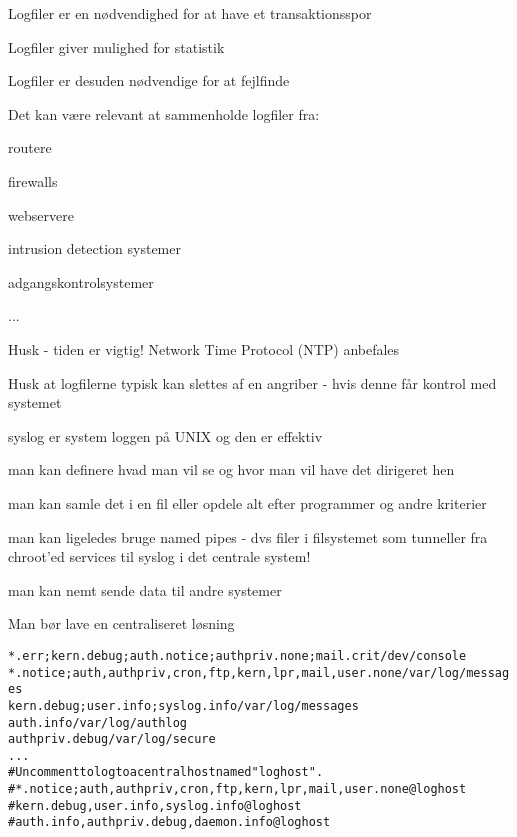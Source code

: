 \documentclass[Screen16to9,17pt]{foils}
\begin{document}

\begin{list1}
\item Logfiler er en nødvendighed for at have et transaktionsspor
\item Logfiler giver mulighed for statistik
\item Logfiler er desuden nødvendige for at fejlfinde
\item Det kan være relevant at sammenholde logfiler fra:
\begin{list2}
\item routere
\item firewalls
\item webservere
\item intrusion detection systemer
\item adgangskontrolsystemer
\item ...
\end{list2}
\item Husk - tiden er vigtig! Network Time Protocol (NTP) anbefales
\item Husk at logfilerne typisk kan slettes af en angriber -
  hvis denne får kontrol med systemet
\end{list1}


\begin{list1}
\item syslog er system loggen på UNIX og den er effektiv
  \begin{list2}
\item man kan definere hvad man vil se og hvor man vil have det
  dirigeret hen
\item man kan samle det i en fil eller opdele alt efter programmer og
  andre kriterier
\item man kan ligeledes bruge named pipes - dvs filer i filsystemet
  som tunneller fra chroot'ed services til syslog i det centrale system!
\item man kan nemt sende data til andre systemer
  \end{list2}
\item Man bør lave en centraliseret løsning
\end{list1}

\begin{alltt}
\small
*.err;kern.debug;auth.notice;authpriv.none;mail.crit    /dev/console
*.notice;auth,authpriv,cron,ftp,kern,lpr,mail,user.none /var/log/messages
kern.debug;user.info;syslog.info                        /var/log/messages
auth.info                                               /var/log/authlog
authpriv.debug                                          /var/log/secure
...
# Uncomment to log to a central host named "loghost".
#*.notice;auth,authpriv,cron,ftp,kern,lpr,mail,user.none        @loghost
#kern.debug,user.info,syslog.info                               @loghost
#auth.info,authpriv.debug,daemon.info                           @loghost
\end{alltt}
\end{document}
